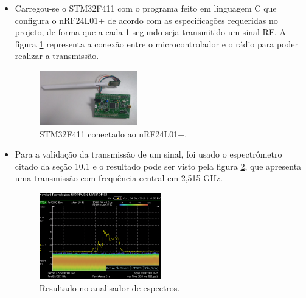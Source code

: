 \begin{itemize}
    \item Carregou-se o STM32F411 com o programa feito em linguagem C \citep{gitnrf} que configura o nRF24L01+ de acordo com as especificações requeridas no projeto, de forma que a cada 1 segundo seja transmitido um sinal RF. A figura \ref{fig:figura103} representa a conexão entre o microcontrolador e o rádio para poder realizar a transmissão.
    
    \begin{figure}[!ht]
	\centering
	\includegraphics[width=0.4\textwidth, angle=90]{Figuras/stm_radio.jpeg}   
	\caption{STM32F411 conectado ao nRF24L01+.}
	\label{fig:figura103}
    \end{figure}
    
    \item Para a validação da transmissão de um sinal, foi usado o espectrômetro citado da seção 10.1 e o resultado pode ser visto pela figura \ref{fig:figura104}, que apresenta uma transmissão com frequência central em 2,515 GHz.
    
    \begin{figure}[!ht]
	\centering
	\includegraphics[width=0.5\textwidth]{Figuras/File_01.png}  
	\caption{Resultado no analisador de espectros.}
	\label{fig:figura104}
    \end{figure}

\end{itemize}
